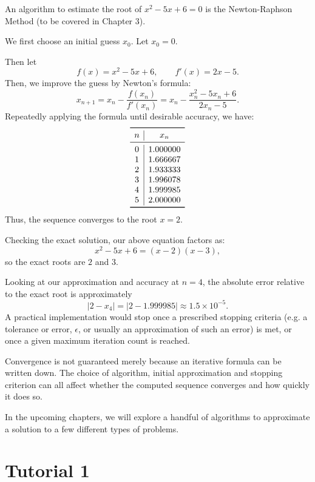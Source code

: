 \begin{solution}[9.0cm]
An algorithm to estimate the root of $x^2 -5x +6 =0$ is the Newton-Raphson Method (to be covered in Chapter 3).

\noindent
We first choose an initial guess $x_0$. Let $x_0 = 0$.

\noindent
Then let
\[
 f(x)=x^2-5x+6,
 \qquad f'(x)=2x-5.
\]
Then, we improve the guess by Newton's formula:
\[
 x_{n+1}=x_n-\frac{f(x_n)}{f'(x_n)}
 =x_n-\frac{x_n^2-5x_n+6}{2x_n-5}.
\]
Repeatedly applying the formula until desirable accuracy, we have:
\[
\begin{array}{c|c}
\toprule
n & x_n\\
\midrule
0&1.000000\\
1&1.666667\\
2&1.933333\\
3&1.996078\\
4&1.999985\\
5&2.000000\\
\bottomrule
\end{array}
\]
Thus, the sequence converges to the root $x=2$.

\bigskip \noindent
Checking the exact solution, our above equation factors as:
\[
 x^2-5x+6=(x-2)(x-3),
\]
so the exact roots are $2$ and $3$.

\bigskip \noindent
Looking at our approximation and accuracy at $n=4$, the absolute error relative to the exact root is approximately
\[
 |2-x_4| = |2-1.999985|\approx1.5\times10^{-5}.
\]
A practical implementation would stop once a prescribed stopping criteria (e.g. a tolerance or error, $\epsilon$, or usually an approximation of such an error) is met, or once a given maximum iteration count is reached.
\end{solution}

\begin{remark}
Convergence is not guaranteed merely because an iterative formula can be written down. The choice of algorithm, initial approximation and stopping criterion can all affect whether the computed sequence converges and how quickly it does so.
\end{remark}

\bigskip

In the upcoming chapters, we will explore a handful of algorithms to approximate a solution to a few different types of problems.

\section*{Tutorial 1}

